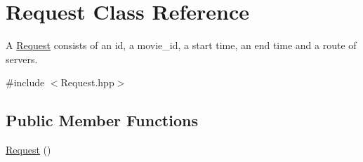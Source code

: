 \hypertarget{class_request}{\section{Request Class Reference}
\label{dd/dce/class_request}
}


A \hyperlink{class_request}{Request} consists of an id, a movie\-\_\-id, a start time, an end time and a route of servers.  




{\ttfamily \#include $<$Request.\-hpp$>$}

\subsection*{Public Member Functions}
\begin{DoxyCompactItemize}
\item 
\hypertarget{class_request_afaf8d8928de7ffff8a3767589489bd33}{\hyperlink{class_request_afaf8d8928de7ffff8a3767589489bd33}{Request} ()}\label{dd/dce/class_request_afaf8d8928de7ffff8a3767589489bd33}


\end{DoxyCompactItemize}
